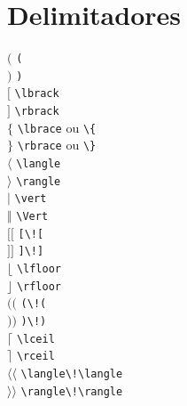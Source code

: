 \documentclass[xindy,draft]{fei}
\begin{document}
\section{Delimitadores}
\begin{multicols}{3}
\noindent
\((\) \verb+(+\\
\()\) \verb+)+\\
\(\lbrack\) \verb+\lbrack+\\
\(\rbrack\) \verb+\rbrack+\\
\(\lbrace\) \verb+\lbrace+ ou \verb+\{+\\
\(\rbrace\) \verb+\rbrace+ ou \verb+\}+\\
\(\langle\) \verb+\langle+\\
\(\rangle\) \verb+\rangle+\\
\(\vert\) \verb+\vert+\\
\(\Vert\) \verb+\Vert+\\
\([\![\) \verb+[\![+\\
\(]\!]\) \verb+]\!]+\\
\(\lfloor\) \verb+\lfloor+\\
\(\rfloor\) \verb+\rfloor+\\
\((\!(\) \verb+(\!(+\\
\()\!)\) \verb+)\!)+\\
\(\lceil\) \verb+\lceil+\\
\(\rceil\) \verb+\rceil+\\
\(\langle\!\langle\) \verb+\langle\!\langle+\\
\(\rangle\!\rangle\) \verb+\rangle\!\rangle+\\
\end{multicols}
\end{document}
